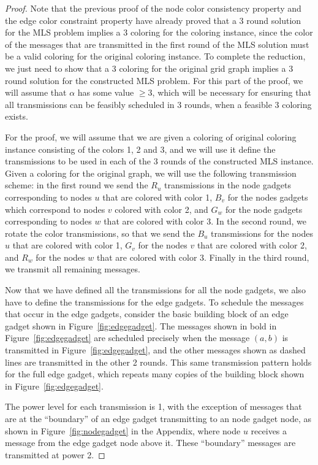 \documentclass{article}
\begin{document}
\begin{proof}
Note that the previous proof of the node color consistency property and the edge color constraint property have already proved that a 3 round solution for the MLS problem implies a 3 coloring for the coloring instance, since the color of the messages that are transmitted in the first round of the MLS solution must be a valid coloring for the original coloring instance.  To complete the reduction, we just need to show that a 3 coloring for the original grid graph implies a 3 round solution for the constructed MLS problem.  For this part of the proof, we will assume that $\alpha$ has some value $\geq 3$, which will be necessary for ensuring that all transmissions can be feasibly scheduled in 3 rounds, when a feasible 3 coloring exists.

For the proof, we will assume that we are given a coloring of original coloring instance consisting of the colors 1, 2 and 3, and we will use it define the transmissions to be used in each of the 3 rounds of the constructed MLS instance.  Given a coloring for the original graph, we will use the following transmission scheme: in the first round we send the $R_u$ transmissions in the node gadgets corresponding to nodes $u$ that are colored with color 1, $B_v$ for the nodes gadgets which correspond to nodes $v$ colored with color 2, and $G_w$ for the node gadgets corresponding to nodes $w$ that are colored with color 3.  In the second round, we rotate the color transmissions, so that we send the $B_u$ transmissions for the nodes $u$ that are colored with color 1, $G_v$ for the nodes $v$ that are colored with color 2, and $R_w$ for the nodes $w$ that are colored with color 3.  Finally in the third round, we transmit all remaining messages.

Now that we have defined all the transmissions for all the node gadgets, we also have to define the transmissions for the edge gadgets.  To schedule the messages that occur in the edge gadgets, consider the basic building block of an edge gadget shown in Figure~\ref{fig:edgegadget}.  The messages shown in bold in Figure~\ref{fig:edgegadget} are scheduled precisely when the message $(a,b)$ is transmitted in Figure~\ref{fig:edgegadget}, and the other messages shown as dashed lines are transmitted in the other 2 rounds.  This same transmission pattern holds for the full edge gadget, which repeats many copies of the building block shown in Figure~\ref{fig:edgegadget}.

The power level for each transmission is 1, with the exception of messages that are at the ``boundary'' of an edge gadget transmitting to an node gadget node, as shown in Figure~\ref{fig:nodegadget} in the Appendix, where node $u$ receives a message from the edge gadget node above it.  These ``boundary'' messages are transmitted at power 2.


\end{proof}
\end{document}
